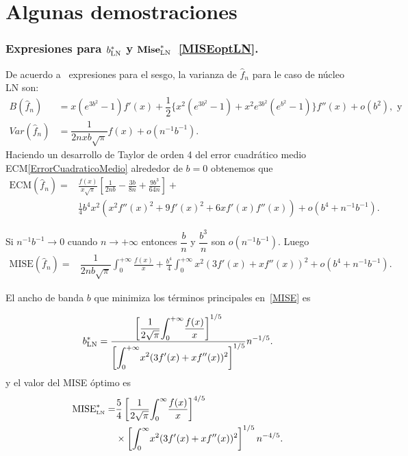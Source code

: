 \chapter{Algunas demostraciones}

\subsection{Expresiones para $b_{\small{\text{LN}}}^*$ y $\textbf{Mise}_{\small{\text{LN}}}^*$~\eqref{MISEoptLN}.}
\label{byMiseOptLN}
\begin{dem}
	De acuerdo a~\cite{Libnegue2013} expresiones para el sesgo, la varianza de $\widehat{f}_n$ para le caso de núcleo LN son:
	\begin{align}
	B(\widehat{f}_n)&=x(e^{3 b^2}-1) f'(x)+\dfrac{1}{2}\{x^2(e^{3 b^2}-1)+x^2 e^{3b^2}(e^{b^2}-1)\}f''(x)+o(b^2), \text{ y}\\
	Var(\widehat{f}_n)&=\dfrac{1}{2 n x b \sqrt{\pi}} f(x)+o(n^{-1}b^{-1}).
	\end{align}
	Haciendo un desarrollo de Taylor de orden 4 del error cuadrático medio ECM\eqref{ErrorCuadraticoMedio} alrededor de $b=0$ obtenemos que
	\begin{align}
	\text{ECM}(\widehat{f}_n)=&\frac{f(x)}{x \sqrt{\pi}}\left[\frac{1}{2 n b}-\frac{3 b}{8 n}+\frac{9 b^3}{64 n}\right]+\\
	&\frac{1}{4} b^4 x^2 \left(x^2 f''(x)^2+9 f'(x)^2+6 x f'(x) f''(x)\right)+o\left(b^4+n^{-1}b^{-1}\right).
	\end{align}
	
	Si $n^{-1}b^{-1} \to 0$ cuando $n \to +\infty$ entonces $\dfrac{b}{n}$ y $\dfrac{b^3}{n}$ son $o(n^{-1}b^{-1})$.
	Luego
	\begin{align}
	\label{MISE:apendice}
	\text{MISE}(\widehat{f}_n)=&\dfrac{1}{2 n b \sqrt{\pi}} \int_{0}^{+\infty}\frac{f(x)}{x}+\frac{b^4}{4} \int_{0}^{+\infty} x^2\left(3f'(x)+xf''(x)\right)^2+o\left(b^4+n^{-1}b^{-1}\right).
	\end{align}
	
	El ancho de banda $b$ que minimiza los términos principales en~\ref{MISE} es 
	
	\begin{align}
	b_{\small{\text{LN}}}^*=\dfrac{\left[\dfrac{1}{2\sqrt{\pi}}\displaystyle{\int_0^{+\infty}}\frac{f(x)}{x}\right]^{1/5}}{\left[\displaystyle{\int_0^{+\infty}} x^2(3f'(x)+xf''(x))^2\right]^{1/5}}n^{-1/5}.
	\end{align}
	y el valor del MISE óptimo es
	\begin{align}
	\text{MISE}^*_{\text{\tiny{LN}}}=&\dfrac{5}{4}  \left[\dfrac{1}{2\sqrt{\pi}}\displaystyle{\int_{0}^{\infty}} \frac{f(x)}{x} \right]^{4/5} \\
	&\times \left[\displaystyle{\int_{0}^{\infty}}  x^2 (3 f'(x) + x f''(x))^2 \right]^{1/5} n^{-4/5} .
	\end{align}
\end{dem}